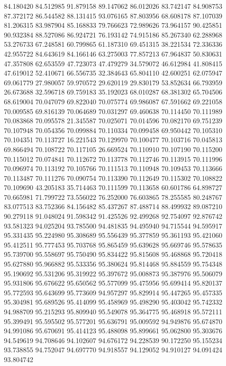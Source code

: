 84.180420
84.512985
91.879158
89.147062
86.012026
83.742147
84.908753
87.372172
86.544582
88.131415
93.076165
87.803956
68.608178
87.107039
81.206315
83.987904
85.168833
79.766623
72.989626
73.964157
90.425851
90.932384
88.527086
86.924721
76.193142
74.915186
85.267340
62.288968
53.276733
67.248581
60.799865
61.187310
69.451315
38.221534
72.336336
42.955722
84.643619
84.166146
63.275003
77.857213
67.964837
50.830631
47.357808
62.653559
47.723073
47.479279
34.579072
46.612984
41.808415
47.619012
52.410671
66.556735
32.384643
65.804110
42.600251
62.075947
69.061779
27.980057
59.970572
29.620119
29.830179
53.852634
66.793959
26.673688
32.596718
69.759183
35.192023
68.010287
68.381302
65.704506
68.619004
70.047079
69.822040
70.075774
69.986087
67.591662
69.221058
70.009585
69.816139
70.064689
70.031297
69.460638
70.114450
70.111989
70.083868
70.095578
21.345587
70.025071
70.014596
70.082170
69.751239
70.107948
70.054356
70.099884
70.110334
70.099458
69.950442
70.105310
70.104351
70.113727
16.221543
70.129970
70.100477
70.103716
70.045813
69.866494
70.108722
70.117105
26.669524
70.110910
70.107190
70.115200
70.115012
70.074841
70.112672
70.113778
70.112746
70.113915
70.111996
70.096974
70.113192
70.105766
70.111513
70.110948
70.109453
70.113666
70.113487
70.111276
70.090754
70.113390
70.112649
70.115302
70.108822
70.109690
43.205183
35.714463
70.111599
70.113658
60.601786
64.898727
70.665981
71.799722
73.556022
76.252000
76.603865
78.255585
80.248767
83.077513
83.752366
84.156482
85.437267
87.488714
88.499932
89.087210
90.279118
91.048024
91.598342
91.425526
92.499268
92.754097
92.876742
93.581323
94.025204
93.785500
94.481835
94.495940
94.715544
94.595917
95.331435
95.224980
95.308689
95.556439
95.377859
95.361193
95.421060
95.412511
95.777453
95.703768
95.865459
95.639628
95.669746
95.578635
95.739700
95.558697
95.750490
95.834422
95.815608
95.468868
95.720418
95.627880
95.966882
95.533356
95.380624
95.814468
95.884559
95.754348
95.190692
95.531206
95.319922
95.397672
95.008873
95.387976
95.506079
95.931806
95.676622
95.650562
95.577099
95.475956
95.699414
95.820137
95.772593
95.643699
95.773609
94.957297
95.829914
95.447265
95.457335
95.304981
95.689526
95.414099
95.458969
95.498290
95.403042
95.742332
94.988709
95.215293
95.809940
95.549078
95.364775
95.468918
95.572111
95.399491
95.595502
95.577201
95.636791
95.009592
94.949876
95.674870
94.991086
95.670691
95.414123
95.488098
95.899661
95.062800
95.303676
94.549619
94.708646
94.102607
94.676172
94.228539
90.172250
95.155234
93.738855
94.752047
94.697770
94.918557
94.129052
94.910127
94.091424
93.804742
